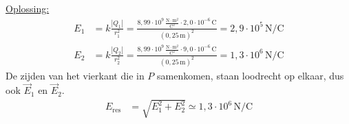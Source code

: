 \documentclass{ximera}
\begin{document}
\begin{exercise}
\begin{solution}
        \underline{Oplossing:}\\
        \begin{align*}
            E_{1} &= k \frac{|Q_{1}|}{r_{1}^{2}} = \frac{8{,}99 \cdot 10^{9} \, \mathrm{\frac{N \cdot m^2}{C^2}} \cdot 2{,}0 \cdot 10^{-6} \, \mathrm{C}}{(0{,}25 \, \mathrm{m})^{2}} = 2{,}9 \cdot 10^{5} \, \mathrm{N/C} \\
            E_{2} &= k \frac{|Q_{2}|}{r_{2}^{2}} = \frac{8{,}99 \cdot 10^{9} \, \mathrm{\frac{N \cdot m^2}{C^2}} \cdot 9{,}0 \cdot 10^{-6} \, \mathrm{C}}{(0{,}25 \, \mathrm{m})^{2}} = 1{,}3 \cdot 10^{6} \, \mathrm{N/C}
        \end{align*}
        De zijden van het vierkant die in $P$ samenkomen, staan loodrecht op elkaar, dus ook $\vec{E}_1$ en $\vec{E}_2$.
        \begin{align*}
            E_{\text{res}} &= \sqrt{E_1^{2} + E_2^{2}} \simeq \boxed{1{,}3 \cdot 10^{6} \, \mathrm{N/C}}
        \end{align*}
    \end{solution}
\end{exercise}
\end{document}
